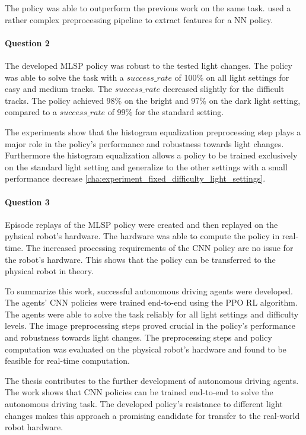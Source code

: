 The policy was able to outperform the previous work on the same task. \textcite{maximilian} used a rather complex preprocessing pipeline to extract features for a \ac{NN} policy.

\paragraph{Question 2}
The developed \ac{MLSP} policy was robust to the tested light changes. The policy was able to solve the task with a $success\_rate$ of 100\% on all light settings for easy and medium tracks. The $success\_rate$ decreased slightly for the difficult tracks. The policy achieved 98\% on the bright and 97\% on the dark light setting, compared to a $success\_rate$ of 99\% for the standard setting.

The experiments show that the histogram equalization preprocessing step plays a major role in the policy's performance and robustness towards light changes. Furthermore the histogram equalization allows a policy to be trained exclusively on the standard light setting and generalize to the other settings with a small performance decrease \ref{cha:experiment_fixed_difficulty_light_settings}.

\paragraph{Question 3}
Episode replays of the \ac{MLSP} policy were created and then replayed on the pyhsical robot's hardware. The hardware was able to compute the policy in real-time. The increased processing requirements of the \ac{CNN} policy are no issue for the robot's hardware. This shows that the policy can be transferred to the physical robot in theory.



To summarize this work, successful autonomous driving agents were developed. The agents' \ac{CNN} policies were trained end-to-end using the \ac{PPO} \ac{RL} algorithm. The agents were able to solve the task reliably for all light settings and difficulty levels. The image preprocessing steps proved crucial in the policy's performance and robustness towards light changes. The preprocessing steps and policy computation was evaluated on the physical robot's hardware and found to be feasible for real-time computation.

The thesis contributes to the further development of autonomous driving agents. The work shows that \ac{CNN} policies can be trained end-to-end to solve the autonomous driving task. The developed policy's resistance to different light changes makes this approach a promising candidate for transfer to the real-world robot hardware.



